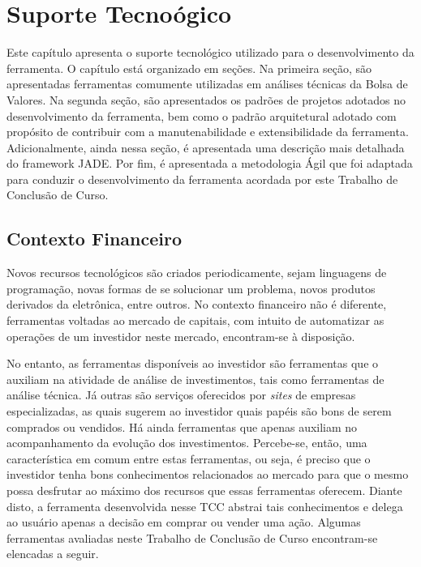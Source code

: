 \chapter[SUPORTE TECNOLÓGICO]{Suporte Tecnoógico}

Este capítulo apresenta o suporte tecnológico utilizado para o desenvolvimento da ferramenta. O capítulo está organizado em seções. Na primeira seção, são apresentadas ferramentas comumente utilizadas em análises técnicas da Bolsa de Valores. Na segunda seção, são apresentados os padrões de projetos adotados no desenvolvimento da ferramenta, bem como o padrão arquitetural adotado com propósito de contribuir com a manutenabilidade e extensibilidade da ferramenta. Adicionalmente, ainda nessa seção, é apresentada uma descrição mais detalhada do framework JADE. Por fim, é apresentada a metodologia Ágil que foi adaptada para conduzir o desenvolvimento da ferramenta acordada por este Trabalho de Conclusão de Curso.


\section{Contexto Financeiro}

Novos recursos tecnológicos são criados periodicamente, sejam linguagens de programação, novas formas de se solucionar um problema, novos produtos derivados da eletrônica, entre outros. No contexto financeiro não é diferente, ferramentas voltadas ao mercado de capitais, com intuito de automatizar as operações de um investidor neste mercado, encontram-se à disposição.

No entanto, as ferramentas disponíveis ao investidor são ferramentas que o auxiliam na atividade de análise de investimentos, tais como ferramentas de análise técnica. Já outras são serviços oferecidos por \textit{sites} de empresas especializadas, as quais sugerem ao investidor quais papéis são bons de serem comprados ou vendidos. Há ainda ferramentas que apenas auxiliam no acompanhamento da evolução dos investimentos. Percebe-se, então, uma característica em comum entre estas ferramentas, ou seja, é preciso que o investidor tenha bons conhecimentos relacionados ao mercado para que o mesmo possa desfrutar ao máximo dos recursos que essas ferramentas oferecem. Diante disto, a ferramenta desenvolvida nesse TCC abstrai tais conhecimentos e delega ao usuário apenas a decisão em comprar ou vender uma ação. Algumas ferramentas avaliadas neste Trabalho de Conclusão de Curso encontram-se elencadas a seguir.

